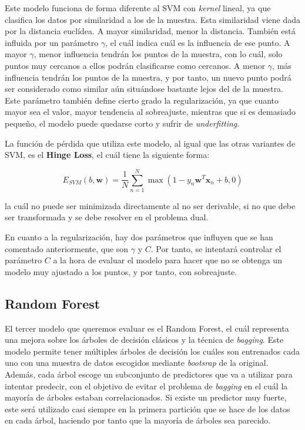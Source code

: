 \documentclass[11pt,a4paper]{article}
\begin{document}
Este modelo funciona de forma diferente al SVM con \textit{kernel} lineal, ya que clasifica los datos por similaridad a los de la muestra.
Esta similaridad viene dada por la distancia euclídea. A mayor similaridad, menor la distancia. También está influida por un parámetro
$\gamma$, el cuál indica cuál es la influencia de ese punto. A mayor $\gamma$, menor influencia tendrán los puntos de la muestra, con lo cuál,
solo puntos muy cercanos a ellos podrán clasificarse como cercanos. A menor $\gamma$, más influencia tendrán los puntos de la muestra, y por
tanto, un nuevo punto podrá ser considerado como similar aún situándose bastante lejos del de la muestra. Este parámetro también define
cierto grado la regularización, ya que cuanto mayor sea el valor, mayor tendencia al sobreajuste, mientras que si es demasiado pequeño,
el modelo puede quedarse corto y sufrir de \textit{underfitting}.

La función de pérdida que utiliza este modelo, al igual que las otras variantes de SVM, es el \textbf{Hinge Loss}, el cuál tiene la siguiente
forma:

\begin{equation}
\label{eq:hinge-loss}
E_{SVM}(b, \mathbf{w}) = \frac{1}{N} \sum_{n=1}^N \max(1 - y_n \mathbf{w}^T\mathbf{x}_n + b , 0)
\end{equation}

\noindent la cuál no puede ser minimizada directamente al no ser derivable, si no que debe ser transformada y se debe resolver en el problema
dual.

En cuanto a la regularización, hay dos parámetros que influyen que se han comentado anteriormente, que son $\gamma$ y $C$. Por tanto, se
intentará controlar el parámetro $C$ a la hora de evaluar el modelo para hacer que no se obtenga un modelo muy ajustado a los puntos, y por
tanto, con sobreajuste.

\subsection{Random Forest}

El tercer modelo que queremos evaluar es el Random Forest, el cuál representa una mejora sobre los árboles de decisión clásicos y la técnica
de \textit{bagging}. Este modelo permite tener múltiples árboles de decisión los cuáles son entrenados cada uno con una muestra de datos
escogidos mediante \textit{bootsrap} de la original. Además, cada árbol escoge un subconjunto de predictores que va a utilizar para intentar
predecir, con el objetivo de evitar el problema de \textit{bagging} en el cuál la mayoría de árboles estaban correlacionados. Si
existe un predictor muy fuerte, este será utilizado casi siempre en la primera partición que se hace de los datos en cada árbol, haciendo por
tanto que la mayoría de árboles sea parecido.
\end{document}
